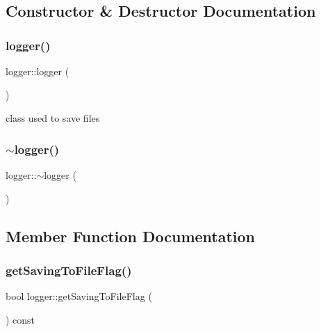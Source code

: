 \subsection{Constructor \& Destructor Documentation}
\mbox{\label{classlogger_a4f753a510e00c892b38e95c2284363a6}} 
\subsubsection{\texorpdfstring{logger()}{logger()}}
{\footnotesize\ttfamily logger\+::logger (\begin{DoxyParamCaption}{ }\end{DoxyParamCaption})}



class used to save files 

\mbox{\label{classlogger_aadd537feeeb16186f6aeb4ca0267a8d7}} 
\subsubsection{\texorpdfstring{$\sim$logger()}{~logger()}}
{\footnotesize\ttfamily logger\+::$\sim$logger (\begin{DoxyParamCaption}{ }\end{DoxyParamCaption})}



\subsection{Member Function Documentation}
\mbox{\label{classlogger_a1e070c45351986c87fe9c697b149de8d}} 
\subsubsection{\texorpdfstring{get\+Saving\+To\+File\+Flag()}{getSavingToFileFlag()}}
{\footnotesize\ttfamily bool logger\+::get\+Saving\+To\+File\+Flag (\begin{DoxyParamCaption}{ }\end{DoxyParamCaption}) const}




